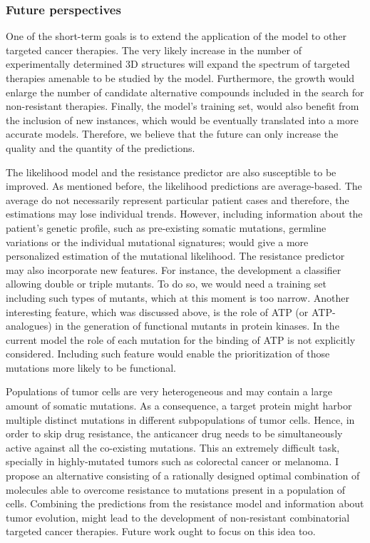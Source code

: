 \documentclass[11pt, b5paper,twoside]{tesi_upf}
\begin{document}
 
\subsubsection{Future perspectives}

\par One of the short-term goals is to extend the application of the model to other targeted cancer therapies. The very likely increase in the number of experimentally determined 3D structures will expand the spectrum of targeted therapies amenable to be studied by the model. Furthermore, the growth would enlarge the number of candidate alternative compounds included in the search for non-resistant therapies. Finally, the model's training set, would also benefit from the inclusion of new instances, which would be eventually translated into a more accurate models. Therefore, we believe that the future can only increase the quality and the quantity of the predictions. 
\par The likelihood model and the resistance predictor are also susceptible to be improved.  As mentioned before, the likelihood predictions are average-based. The average do not necessarily represent particular patient cases and therefore, the estimations may lose individual trends. However, including information about the patient's genetic profile, such as pre-existing somatic mutations, germline variations or the individual mutational signatures; would give a more personalized estimation of the mutational likelihood. The resistance predictor may also incorporate new features. For instance, the development a classifier allowing double or triple mutants. To do so, we would need a training set including such types of mutants, which at this moment is too narrow. Another interesting feature, which was discussed above, is the role of ATP (or ATP-analogues) in the generation of functional mutants in protein kinases. In the current model the role of each mutation for the binding of ATP is not explicitly considered. Including such feature would enable the prioritization of those mutations more likely to be functional.
\par Populations of tumor cells are very heterogeneous and may contain a large amount of somatic mutations. As a consequence, a target protein might harbor multiple distinct mutations in different subpopulations of tumor cells. Hence, in order to skip drug resistance, the anticancer drug needs to be simultaneously active against all the co-existing mutations. This an extremely difficult task, specially in highly-mutated tumors such as colorectal cancer or melanoma. I propose an alternative consisting of a rationally designed  optimal combination of molecules able to overcome resistance to mutations present in a population of cells. Combining the predictions from the resistance model and information about tumor evolution, might lead to the development of non-resistant combinatorial targeted cancer therapies. Future work ought to focus on this idea too.
\end{document}
